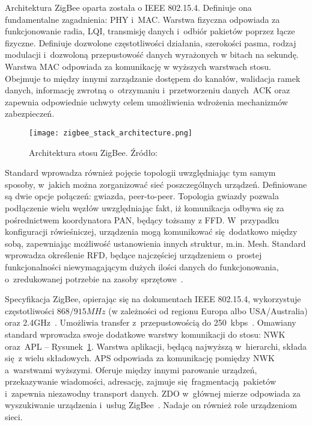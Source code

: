 Architektura ZigBee oparta została o IEEE 802.15.4. Definiuje ona fundamentalne zagadnienia:
\gls{PHY} i~\gls{MAC}. Warstwa fizyczna odpowiada za funkcjonowanie
radia, \gls{LQI}, transmisję danych i~odbiór pakietów poprzez łącze fizyczne. Definiuje dozwolone
częstotliwości działania, szerokości pasma, rodzaj modulacji i~dozwoloną przepustowość danych
wyrażonych w bitach na sekundę. Warstwa MAC odpowiada za komunikację w wyższych warstwach stosu.
Obejmuje to między innymi zarządzanie dostępem do kanałów, walidacja ramek danych, informację
zwrotną o~otrzymaniu i~przetworzeniu danych~\gls{ACK} oraz zapewnia odpowiednie
uchwyty celem umożliwienia wdrożenia mechanizmów zabezpieczeń.

\begin{figure}[!ht]
	\centering \texttt{[image: zigbee\_stack\_architecture.png]}
	\caption{Architektura stosu ZigBee. Źródło:~\cite{zigbee_alliance_zigbee_2017}}
	\label{rys:zigbee_stack_architecture}
\end{figure}

Standard wprowadza również pojęcie topologii uwzględniając tym samym sposoby,
w~jakich można zorganizować sieć poszczególnych urządzeń. Definiowane są dwie
opcje połączeń: gwiazda, peer-to-peer. Topologia gwiazdy pozwala podłączenie wielu węzłów
uwzględniając fakt, iż komunikacja odbywa się za pośrednictwem koordynatora \gls{PAN},
będący tożsamy z \gls{FFD}. W~przypadku konfiguracji rówieśniczej, urządzenia mogą 
komunikować się dodatkowo między sobą, zapewniając możliwość ustanowienia innych struktur, m.in. 
Mesh. Standard wprowadza określenie \gls{RFD}, będące najczęściej urządzeniem o~prostej funkcjonalności 
niewymagającym dużych ilości danych do funkcjonowania, o~zredukowanej potrzebie na 
zasoby sprzętowe~\cite{ieee_p80215_working_group_ieee_nodate}.

Specyfikacja ZigBee, opierając się na dokumentach IEEE 802.15.4, wykorzystuje częstotliwości
$868/915 MHz$ (w zależności od regionu Europa albo USA/Australia) oraz 2.4GHz~\cite{zigbee_alliance_zigbee_2017}.
Umożliwia transfer z~przepustowością do 250~kbps~\cite{silicon_laboratories_ug10302_2021}.
Omawiany standard wprowadza swoje dodatkowe warstwy komunikacji do stosu: \gls{NWK} oraz~\gls{APL} --
Rysunek~\ref{rys:zigbee_stack_architecture}.
Warstwa aplikacji, będącą najwyższą w~hierarchi, składa się z wielu składowych. \gls{APS} odpowiada za
komunikację pomiędzy \gls{NWK} a~warstwami wyższymi. Oferuje między innymi parowanie urządzeń,
przekazywanie wiadomości, adresację, zajmuje się fragmentacją pakietów i~zapewnia niezawodny transport danych.
\gls{ZDO} w~głównej mierze odpowiada za wyszukiwanie urządzenia i~usług ZigBee~\cite{stmicroelectronics_an5506_2020, zigbee_alliance_zigbee_2017}.
Nadaje on również role urządzeniom sieci.

